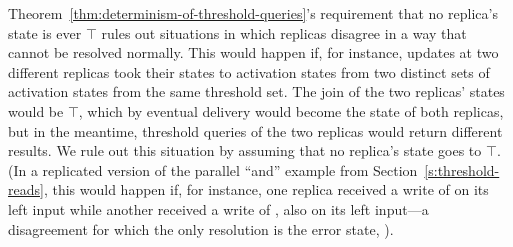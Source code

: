 Theorem~\ref{thm:determinism-of-threshold-queries}'s requirement that
no replica's state is ever $\top$ rules out situations in which
replicas disagree in a way that cannot be resolved normally.  This
would happen if, for instance, updates at two different replicas took
their states to activation states from two distinct sets of activation
states from the same threshold set.  The join of the two replicas'
states would be $\top$, which by eventual delivery would become the
state of both replicas, but in the meantime, threshold queries of the
two replicas would return different results.  We rule out this
situation by assuming that no replica's state goes to $\top$.  (In a
replicated version of the parallel ``and'' example from
Section~\ref{s:threshold-reads}, this would happen if, for instance,
one replica received a write of  on its left input while another
received a write of , also on its left input---a disagreement
for which the only resolution is the error state, ).
